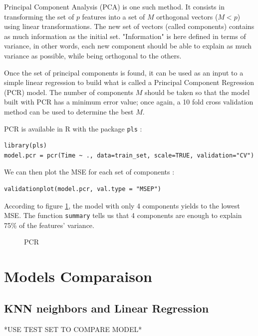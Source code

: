 \documentclass[]{report}
\newcommand{\inputtikz}[2]{%
	\scalebox{#1}{}  
}
\begin{document}
Principal Component Analysis (PCA) is one such method. It consists in transforming the set of $p$ features into a set of $M$ orthogonal vectors ($M < p$) using linear transformations. The new set of vectors (called components) contains as much information as the initial set. "Information" is here defined in terms of variance, in other words, each new component should be able to explain as much variance as possible, while being orthogonal to the others.

Once the set of principal components is found, it can be used as an input to a simple linear regression to build what is called a Principal Component Regression (PCR) model. The number of components $M$ should be taken so that the model built with PCR has a minimum error value; once again, a 10 fold cross validation method can be used to determine the best $M$.

PCR is available in R with the package \texttt{pls} :
\begin{lstlisting}
library(pls)
model.pcr = pcr(Time ~ ., data=train_set, scale=TRUE, validation="CV")
\end{lstlisting}

We can then plot the MSE for each set of components :
\begin{lstlisting}
validationplot(model.pcr, val.type = "MSEP")
\end{lstlisting}

According to figure \ref{fig:pcr_cv}, the model with only 4 components yields to the lowest MSE. The function \texttt{summary} tells us that 4 components are enough to explain 75\% of the features' variance. 

\begin{figure}[!h]
	\centering
	\inputtikz{0.5}{Figures/pcr_cv.tex}
	\caption{PCR}
	\label{fig:pcr_cv}
\end{figure}



\section{Models Comparaison}
\subsection{KNN neighbors and Linear Regression}
*USE TEST SET TO COMPARE MODEL*
\end{document}
